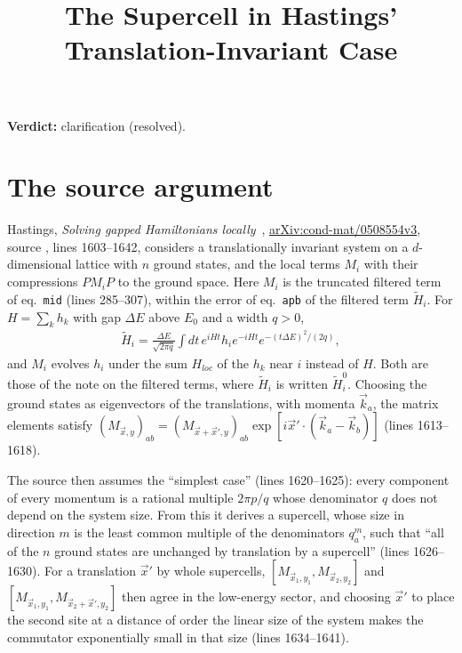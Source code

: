\documentclass{article}
\title{The Supercell in Hastings' Translation-Invariant Case}
\author{}
\date{}
\providecommand{\gapnote}[2]{\par\noindent\textbf{Verdict:} #1 (#2).\par}
\begin{document}
\maketitle
\gapnote{clarification}{resolved}

\section{The source argument}
Hastings, \emph{Solving gapped Hamiltonians locally}~\cite{Hastings2006Solving},
\href{https://arxiv.org/abs/cond-mat/0508554v3}{arXiv:cond-mat/0508554v3},
source , lines 1603--1642, considers a translationally
invariant system on a $d$-dimensional lattice with $n$ ground states, and the
local terms $M_i$ with their compressions $P M_i P$ to the ground space. Here
$M_i$ is the truncated filtered term of eq.~\texttt{mid} (lines 285--307),
within the error of eq.~\texttt{apb} of the filtered term $\tilde H_i$.
For $H=\sum_kh_k$ with gap $\Delta E$ above $E_0$ and a width $q>0$,
\begin{align}
    \tilde H_i=\frac{\Delta E}{\sqrt{2\pi q}}\int dt\,e^{iHt}h_ie^{-iHt}
    e^{-(t\Delta E)^2/(2q)},
    \label{eq:hastings05_translation_supercell_filtered_term}
\end{align}
and $M_i$ evolves $h_i$ under the sum $H_{loc}$ of
the $h_k$ near $i$ instead of $H$. Both are those of the note
 on the filtered terms, where
$\tilde H_i$ is written $\tilde H_i^0$. Choosing the ground states as eigenvectors of the translations, with
momenta $\vec k_a$, the matrix elements satisfy
$(M_{\vec x,y})_{ab}=(M_{\vec x+\vec x',y})_{ab}
    \exp[i\vec x'\cdot(\vec k_a-\vec k_b)]$ (lines 1613--1618).

The source then assumes the ``simplest case'' (lines 1620--1625): every
component of every momentum is a rational multiple $2\pi p/q$ whose
denominator $q$ does not depend on the system size. From this it derives a
supercell, whose size in direction $m$ is the least common multiple of the
denominators $q^m_a$, such that ``all of the $n$ ground states are unchanged by
translation by a supercell'' (lines 1626--1630). For a translation $\vec x'$
by whole supercells, $[M_{\vec x_1,y_1},M_{\vec x_2,y_2}]$ and
$[M_{\vec x_1,y_1},M_{\vec x_2+\vec x',y_2}]$ then agree in the low-energy
sector, and choosing $\vec x'$ to place the second site at a distance of order
the linear size of the system makes the commutator exponentially small in that
size (lines 1634--1641).
\end{document}

